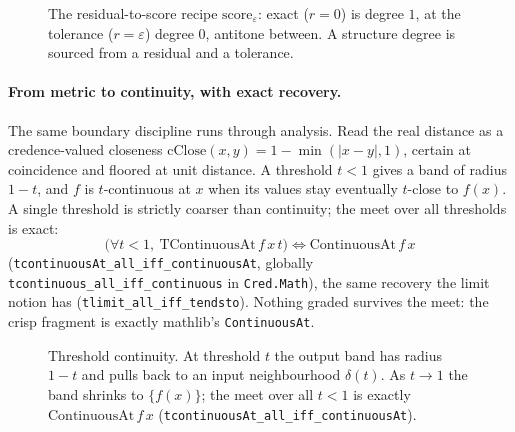 \documentclass[11pt,a4paper]{article}
\newcommand{\Lean}[1]{\texttt{#1}}
\begin{document}
\begin{figure}[h]
\centering
{}
\caption{The residual-to-score recipe $\mathrm{score}_\varepsilon$:
exact ($r=0$) is degree $1$, at the tolerance ($r=\varepsilon$) degree
$0$, antitone between.  A structure degree is sourced from a residual
and a tolerance.}
\label{fig:score-ramp}
\end{figure}

\paragraph{From metric to continuity, with exact recovery.}
The same boundary discipline runs through analysis.  Read the real
distance as a credence-valued closeness
$\mathrm{cClose}(x,y)=1-\min(|x-y|,1)$, certain at coincidence and
floored at unit distance.  A threshold $t<1$ gives a band of radius
$1-t$, and $f$ is $t$-continuous at $x$ when its values stay eventually
$t$-close to $f(x)$.  A single threshold is strictly coarser than
continuity; the meet over all thresholds is exact:
\[
  \bigl(\forall t<1,\ \mathrm{TContinuousAt}\,f\,x\,t\bigr)
  \iff \mathrm{ContinuousAt}\,f\,x
\]
(\Lean{tcontinuousAt\_all\_iff\_continuousAt}, globally
\Lean{tcontinuous\_all\_iff\_continuous} in \texttt{Cred.Math}), the same
recovery the limit notion has (\Lean{tlimit\_all\_iff\_tendsto}).
Nothing graded survives the meet: the crisp fragment is exactly
mathlib's \texttt{ContinuousAt}.

\begin{figure}[h]
\centering
{}
\caption{Threshold continuity.  At threshold $t$ the output band has
radius $1-t$ and pulls back to an input neighbourhood $\delta(t)$.  As
$t\to1$ the band shrinks to $\{f(x)\}$; the meet over all $t<1$ is
exactly $\mathrm{ContinuousAt}\,f\,x$
(\Lean{tcontinuousAt\_all\_iff\_continuousAt}).}
\label{fig:threshold-continuity}
\end{figure}
\end{document}
